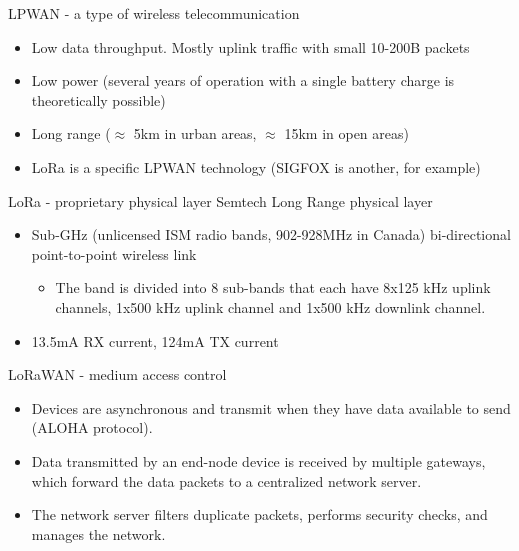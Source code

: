 \documentclass{beamer}
\begin{document}
    \begin{frame}{LPWAN - a type of wireless telecommunication}
        \begin{itemize}
            \item Low data throughput. Mostly uplink traffic with small 10-200B packets 
            \item Low power (several years of operation with a single battery charge is theoretically possible)
            \item Long range ($\approx$ 5km in urban areas, $\approx$ 15km in open areas)
            \item LoRa is a specific LPWAN technology (SIGFOX is another, for example)
        \end{itemize}
    \end{frame}

    \begin{frame}{LoRa - proprietary physical layer}
        Semtech \alert{Lo}ng \alert{Ra}nge physical layer
        \begin{itemize}
            \item Sub-GHz (unlicensed ISM radio bands, 902-928MHz in Canada) bi-directional point-to-point wireless link
            \begin{itemize}
                \item The band is divided into 8 sub-bands that each have 8x125 kHz uplink channels, 1x500 kHz uplink channel and 1x500 kHz downlink channel.
            \end{itemize}
            \item 13.5mA RX current, 124mA TX current
        \end{itemize}
    \end{frame}
    
    \begin{frame}{LoRaWAN - medium access control}
        \begin{itemize}
            \item Devices are asynchronous and transmit when they have data available to send (ALOHA protocol). 
            \item Data transmitted by an end-node device is received by multiple gateways, which forward the data packets to a centralized network server. 
            \item The network server filters duplicate packets, performs security checks, and manages the network. 
        \end{itemize}
    \end{frame}
    
\end{document}
